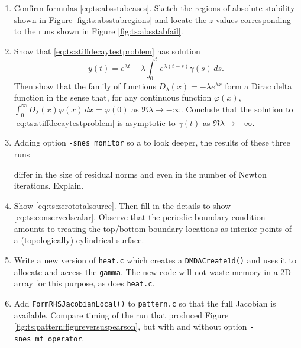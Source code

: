 \begin{enumerate}
\item \label{exer:ts:absstabcases}  Confirm formulas \eqref{eq:ts:absstabcases}.  Sketch the regions of absolute stability shown in Figure \ref{fig:ts:absstabregions} and locate the $z$-values corresponding to the runs shown in Figure \ref{fig:ts:absstabfail}.

\item \label{exer:ts:stiffdecayasymptotic}  Show that \eqref{eq:ts:stiffdecaytestproblem} has solution
    $$y(t) = e^{\lambda t} - \lambda \int_0^t e^{\lambda (t-s)} \gamma(s)\,ds.$$
Then show that the family of functions $D_\lambda(x) = -\lambda e^{\lambda x}$ form a Dirac delta function \citep{Evans2010} in the sense that, for any continuous function $\varphi(x)$, $\int_{0}^\infty D_\lambda(x) \varphi(x)\,dx = \varphi(0)$ as $\Re\lambda \to -\infty$.  Conclude that the solution to \eqref{eq:ts:stiffdecaytestproblem} is asymptotic to $\gamma(t)$ as $\Re\lambda \to -\infty$.

\item \label{exer:ts:fdjacobian}   Adding option \texttt{-snes\_monitor} so a to look deeper, the results of these three runs
differ in the size of residual norms and even in the number of Newton iterations.  Explain.

\item \label{exer:ts:zerototalsource}  Show \eqref{eq:ts:zerototalsource}.  Then fill in the details to show \eqref{eq:ts:conservedscalar}.  Observe that the periodic boundary condition amounts to treating the top/bottom boundary locations as interior points of a (topologically) cylindrical surface.

\item \label{exer:ts:heatneumanndmda} Write a new version of \texttt{heat.c} which creates a \texttt{DMDACreate1d()} and uses it to allocate and access the \pVec \texttt{gamma}.  The new code will not waste memory in a 2D array for this purpose, as does \texttt{heat.c}.

\item \label{exer:ts:patternfulljacobian}  Add \texttt{FormRHSJacobianLocal()} to \texttt{pattern.c} so that the full Jacobian is available.  Compare timing of the run that produced Figure \ref{fig:ts:pattern:figureversuspearson}, but with and without option \texttt{-snes\_mf\_operator}.


\end{enumerate}
